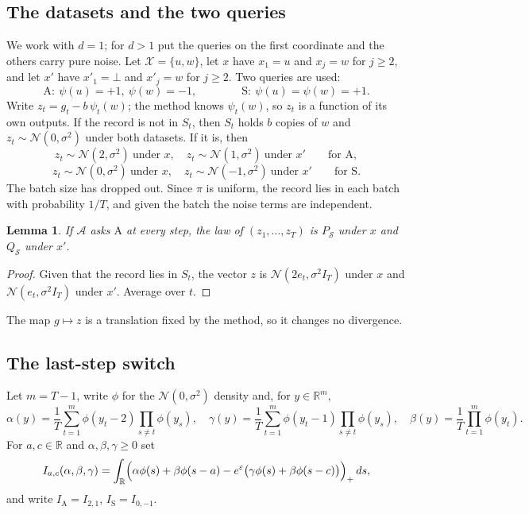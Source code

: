 \documentclass[11pt]{amsart}
\newtheorem{lemma}[theorem]{Lemma}
\theoremstyle{definition}
\theoremstyle{remark}
\newcommand{\R}{\mathbb R}
\newcommand{\N}{\mathcal N}
\newcommand{\ANTI}{\mathrm{A}}
\newcommand{\SAME}{\mathrm{S}}
\begin{document}
\subsection{The datasets and the two queries}
We work with $d=1$; for $d>1$ put the queries on the first coordinate and the others carry pure noise. Let $\mathcal X=\{u,w\}$, let $x$ have $x_1=u$ and $x_j=w$ for $j\ge2$, and let $x'$ have $x'_1=\bot$ and $x'_j=w$ for $j\ge2$. Two queries are used:
\[
\ANTI:\ \psi(u)=+1,\ \psi(w)=-1,\qquad\qquad \SAME:\ \psi(u)=\psi(w)=+1 .
\]
Write $z_t=g_t-b\,\psi_t(w)$; the method knows $\psi_t(w)$, so $z_t$ is a function of its own outputs. If the record is not in $S_t$, then $S_t$ holds $b$ copies of $w$ and $z_t\sim\N(0,\sigma^2)$ under both datasets. If it is, then
\[
z_t\sim\N(2,\sigma^2)\ \text{under }x,\quad z_t\sim\N(1,\sigma^2)\ \text{under }x'\qquad\text{for }\ANTI,
\]
\[
z_t\sim\N(0,\sigma^2)\ \text{under }x,\quad z_t\sim\N(-1,\sigma^2)\ \text{under }x'\qquad\text{for }\SAME .
\]
The batch size has dropped out. Since $\pi$ is uniform, the record lies in each batch with probability $1/T$, and given the batch the noise terms are independent.

\begin{lemma}\label{lem:pair}
If $\mathcal A$ asks $\ANTI$ at every step, the law of $(z_1,\dots,z_T)$ is $P_{\mathcal S}$ under $x$ and $Q_{\mathcal S}$ under $x'$.
\end{lemma}

\begin{proof}
Given that the record lies in $S_t$, the vector $z$ is $\N(2e_t,\sigma^2I_T)$ under $x$ and $\N(e_t,\sigma^2I_T)$ under $x'$. Average over $t$.
\end{proof}

The map $g\mapsto z$ is a translation fixed by the method, so it changes no divergence.

\subsection{The last-step switch}
Let $m=T-1$, write $\phi$ for the $\N(0,\sigma^2)$ density and, for $y\in\R^m$,
\begin{equation}\label{eq:weights}
\alpha(y)=\frac1T\sum_{t=1}^m\phi(y_t-2)\prod_{s\ne t}\phi(y_s),\quad
\gamma(y)=\frac1T\sum_{t=1}^m\phi(y_t-1)\prod_{s\ne t}\phi(y_s),\quad
\beta(y)=\frac1T\prod_{t=1}^m\phi(y_t).
\end{equation}
For $a,c\in\R$ and $\alpha,\beta,\gamma\ge0$ set
\[
I_{a,c}(\alpha,\beta,\gamma)=\int_\R\Bigl(\alpha\phi(s)+\beta\phi(s-a)-e^{\varepsilon}\bigl(\gamma\phi(s)+\beta\phi(s-c)\bigr)\Bigr)_+\,ds,
\]
and write $I_{\ANTI}=I_{2,1}$, $I_{\SAME}=I_{0,-1}$.
\end{document}
